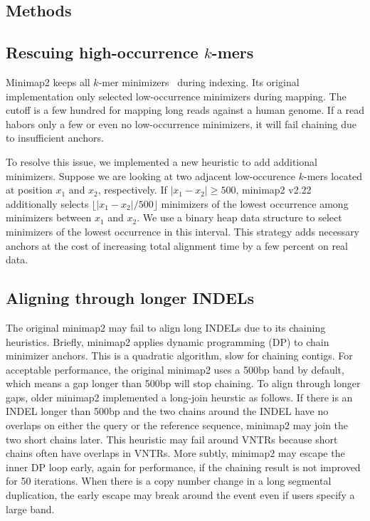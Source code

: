 \documentclass{bioinfo}
\begin{document}
\begin{methods}
\section{Methods}

\subsection{Rescuing high-occurrence $k$-mers}
Minimap2 keeps all $k$-mer minimizers~\citep{Roberts:2004fv} during indexing. Its original
implementation only selected low-occurrence minimizers during mapping. The
cutoff is a few hundred for mapping long reads against a human genome. If a
read habors only a few or even no low-occurrence minimizers, it will fail
chaining due to insufficient anchors.

To resolve this issue, we implemented a new heuristic to add additional
minimizers. Suppose we are looking at two adjacent low-occurence $k$-mers
located at position $x_1$ and $x_2$, respectively. If $|x_1-x_2|\ge500$,
minimap2 v2.22 additionally selects $\lfloor|x_1-x_2|/500\rfloor$ minimizers
of the lowest occurrence among minimizers between $x_1$ and $x_2$.
We use a binary heap data
structure to select minimizers of the lowest occurrence in this interval.
This strategy adds necessary anchors at the cost of increasing total alignment
time by a few percent on real data.

\subsection{Aligning through longer INDELs}
The original minimap2 may fail to align long INDELs due to its chaining
heuristics. Briefly, minimap2 applies dynamic programming (DP) to chain
minimizer anchors. This is a quadratic algorithm, slow for chaining
contigs. For acceptable performance, the original minimap2 uses a 500bp band by
default, which means a gap longer than 500bp will stop chaining.
To align through longer gaps, older minimap2 implemented a long-join heurstic as follows.
If there is an INDEL longer than 500bp and the two chains around the INDEL
have no overlaps on either the query or the reference sequence, minimap2 may
join the two short chains later.
This heuristic may fail around VNTRs because short chains
often have overlaps in VNTRs. More subtly, minimap2 may escape the inner DP
loop early, again for performance, if the chaining result is not improved for
50 iterations. When there is a copy number change in a long segmental
duplication, the early escape may break around the event even if users
specify a large band.


\end{methods}
\end{document}
